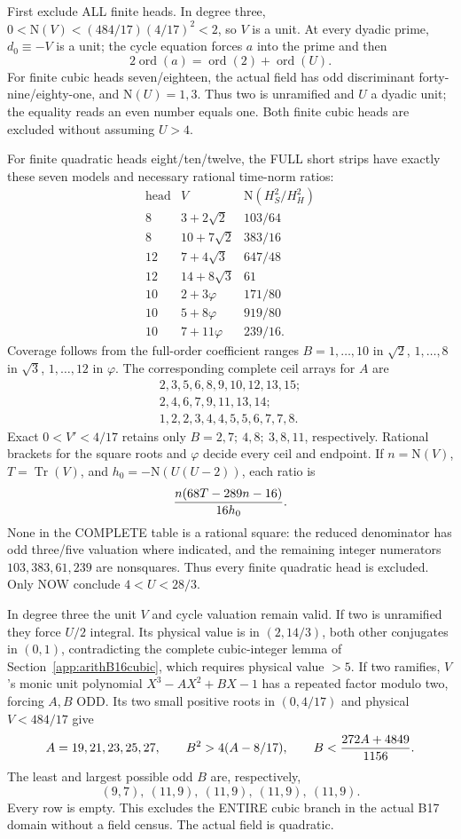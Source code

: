 \documentclass[11pt]{article}
\begin{document}
First exclude ALL finite heads.
In degree three,
\(0<\mathrm N(V)<(484/17)(4/17)^2<2\),
so \(V\) is a unit.
At every dyadic prime, \(d_0\equiv-V\) is a unit;
the cycle equation forces \(a\) into the prime
and then
\[
                     2\operatorname{ord}(a)
                      =\operatorname{ord}(2)+\operatorname{ord}(U).
\]
For finite cubic heads seven/eighteen,
the actual field has odd discriminant
forty-nine/eighty-one, and \(\mathrm N(U)=1,3\).
Thus two is unramified and \(U\) a dyadic unit;
the equality reads an even number equals one.
Both finite cubic heads are excluded without
assuming \(U>4\).

For finite quadratic heads eight/ten/twelve,
the FULL short strips have exactly these seven
models and necessary rational time-norm ratios:
\[
\begin{array}{c|c|c}
 \text{head}&V&
 \mathrm N(H_S^2/H_H^2)\\ \hline
8&3+2\sqrt2&103/64\\
8&10+7\sqrt2&383/16\\
12&7+4\sqrt3&647/48\\
12&14+8\sqrt3&61\\
10&2+3\varphi&171/80\\
10&5+8\varphi&919/80\\
10&7+11\varphi&239/16 .
\end{array}
\]
Coverage follows from the full-order coefficient
ranges \(B=1,\ldots,10\) in \(\sqrt2\),
\(1,\ldots,8\) in \(\sqrt3\),
\(1,\ldots,12\) in \(\varphi\).
The corresponding complete ceil arrays for \(A\) are
\[
 \begin{gathered}
 2,3,5,6,8,9,10,12,13,15;\\
 2,4,6,7,9,11,13,14;\\
 1,2,2,3,4,4,5,5,6,7,7,8 .
 \end{gathered}
\]
Exact \(0<V'<4/17\) retains only
\(B=2,7;\ 4,8;\ 3,8,11\), respectively.
Rational brackets for the square roots and
\(\varphi\) decide every ceil and endpoint.
If \(n=\mathrm N(V)\), \(T=\operatorname{Tr}(V)\),
and \(h_0=-\mathrm N(U(U-2))\), each ratio is
\[
                     {n(68T-289n-16)\over16h_0}.
\]
None in the COMPLETE table is a rational square:
the reduced denominator has odd three/five
valuation where indicated, and the remaining
integer numerators \(103,383,61,239\) are
nonsquares.
Thus every finite quadratic head is excluded.
Only NOW conclude \(4<U<28/3\).

In degree three the unit \(V\) and cycle valuation
remain valid.
If two is unramified they force \(U/2\) integral.
Its physical value is in \((2,14/3)\), both other
conjugates in \((0,1)\), contradicting the
complete cubic-integer lemma of
Section~\ref{app:arithB16cubic}, which requires
physical value \(>5\).
If two ramifies, \(V\)'s monic unit polynomial
\(X^3-AX^2+BX-1\) has a repeated factor modulo
two, forcing \(A,B\) ODD.
Its two small positive roots in \((0,4/17)\)
and physical \(V<484/17\) give
\[
 A=19,21,23,25,27,\qquad
 B^2>4(A-8/17),\qquad
 B<{272A+4849\over1156}.
\]
The least and largest possible odd \(B\) are,
respectively,
\[
                (9,7),\ (11,9),\ (11,9),\ (11,9),\ (11,9).
\]
Every row is empty.
This excludes the ENTIRE cubic branch in the
actual B17 domain without a field census.
The actual field is quadratic.
\end{document}
